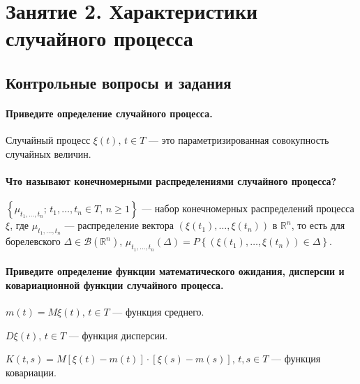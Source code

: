 \chapter*{Занятие 2. Характеристики случайного процесса}

\section*{Контрольные вопросы и задания}

\subsubsection*{Приведите определение случайного процесса.}

Случайный процесс $ \xi \left( t \right), \, t \in T$ ---
это параметризированная совокупность случайных величин.

\subsubsection*{Что называют конечномерными распределениями случайного процесса?}

$ \left\{ \mu_{t_1, \dotsc, t_n}; \, t_1, \dotsc, t_n \in T, \, n \geq 1 \right\} $ ---
набор конечномерных распределений процесса $ \xi $, где $ \mu_{t_1, \dotsc, t_n}$ ---
распределение вектора $ \left( \xi \left( t_1 \right), \dotsc, \xi \left( t_n \right) \right) $ в
$ \mathbb{R}^n$,
то есть для борелевского
$ \Delta \in \mathcal{B} \left( \mathbb{R}^n \right), \,
  \mu_{t_1, \dotsc, t_n} \left( \Delta \right) =
  P \left\{
    \left( \xi \left( t_1 \right), \dotsc, \xi \left( t_n \right) \right) \in \Delta
  \right\} $.

\subsubsection*{Приведите определение функции математического ожидания,
                дисперсии и ковариационной функции случайного процесса.}

$m \left( t \right) = M \xi \left( t \right), \, t \in T$ --- функция среднего.

$D \xi \left( t \right), \, t \in T$ --- функция дисперсии.

$K \left( t, s \right) =
  M \left[ \xi \left( t \right) - m \left( t \right) \right] \cdot
  \left[ \xi \left( s \right) - m \left( s \right) \right], \, t, s \in T$ ---
функция ковариации.


